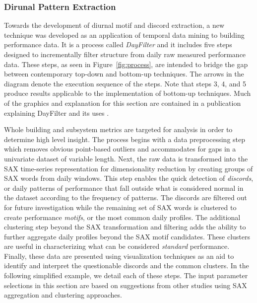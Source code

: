 \subsubsection{Dirunal Pattern Extraction}
\label{sec:dayfilter}

Towards the development of diurnal motif and discord extraction, a new technique was developed as an application of temporal data mining to building performance data. It is a process called \emph{DayFilter} and it includes five steps designed to incrementally filter structure from daily raw measured performance data. These steps, as seen in Figure~\ref{fig:process}, are intended to bridge the gap between contemporary top-down and bottom-up techniques. The arrows in the diagram denote the execution sequence of the steps. Note that steps 3, 4, and 5 produce results applicable to the implementation of bottom-up techniques. Much of the graphics and explanation for this section are contained in a publication explaining DayFilter and its uses \cite{miller_automated_2015}.

Whole building and subsystem metrics are targeted for analysis in order to determine high level insight. The process begins with a data preprocessing step which removes obvious point-based outliers and accommodates for gaps in a univariate dataset of variable length. Next, the raw data is transformed into the SAX time-series representation for dimensionality reduction by creating groups of SAX words from daily windows. This step enables the quick detection of \emph{discords}, or daily patterns of performance that fall outside what is considered normal in the dataset according to the frequency of patterns. The discords are filtered out for future investigation while the remaining set of SAX words is clustered to create performance \emph{motifs}, or the most common daily profiles. The additional clustering step beyond the SAX transformation and filtering adds the ability to further aggregate daily profiles beyond the SAX motif candidates. These clusters are useful in characterizing what can be considered \emph{standard} performance. Finally, these data are presented using visualization techniques as an aid to identify and interpret the questionable discords and the common clusters. In the following simplified example, we detail each of these steps. The input parameter selections in this section are based on suggestions from other studies using SAX aggregation and clustering approaches. 
